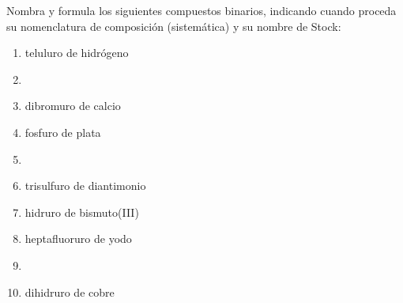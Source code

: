 \documentclass[10pt]{article}
\begin{document}
\begin{exercise}[
    tags    = {inorgánica,compuestos binarios,sales},
    topics  = {química inorgánica,formulación,nomenclatura},
    source  = {SAN Formulación, p26, e30},
  ]

  Nombra y formula los siguientes compuestos binarios, indicando cuando proceda su nomenclatura de composición (sistemática) y su nombre de Stock:

  \begin{enumerate}
    \item teluluro de hidrógeno
    \item {}
    \item dibromuro de calcio
    \item fosfuro de plata
    \item {}
    \item trisulfuro de diantimonio
    \item hidruro de bismuto(III)
    \item heptafluoruro de yodo
    \item {}
    \item dihidruro de cobre
  \end{enumerate}
\end{exercise}
\end{document}
